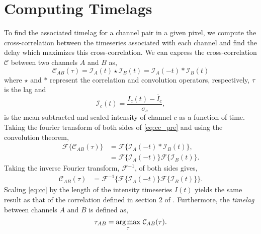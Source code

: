 \section{Computing Timelags}\label{timelag_details}

To find the associated timelag for a channel pair in a given pixel, we compute the cross-correlation between the timeseries associated with each channel and find the delay which maximizes this cross-correlation. We can express the cross-correlation $\mathcal{C}$ between two channels $A$ and $B$ as,
\begin{equation}\label{eq:cc_pre}
    \mathcal{C}_{AB}(\tau) = \mathcal{I}_A(t)\star\mathcal{I}_B(t) = \mathcal{I}_A(-t)\ast\mathcal{I}_B(t)
\end{equation}
where $\star$ and $\ast$ represent the correlation and convolution operators, respectively, $\tau$ is the lag and
\begin{equation*}
    \mathcal{I}_c(t)=\frac{I_c(t)-\bar{I}_c}{\sigma_{c}},
\end{equation*}
is the mean-subtracted and scaled intensity of channel $c$ as a function of time. Taking the fourier transform of both sides of \autoref{eq:cc_pre} and using the convolution theorem,
\begin{align*}
    \mathcal{F}\{\mathcal{C}_{AB}(\tau)\} &= \mathcal{F}\{\mathcal{I}_A(-t)\ast\mathcal{I}_B(t)\},\\
    &= \mathcal{F}\{\mathcal{I}_A(-t)\}\mathcal{F}\{\mathcal{I}_B(t)\}.
\end{align*}
Taking the inverse Fourier transform, $\mathcal{F}^{-1}$, of both sides gives,
\begin{align}\label{eq:cc}
    \mathcal{C}_{AB}(\tau) &= \mathcal{F}^{-1}\{\mathcal{F}\{\mathcal{I}_A(-t)\}\mathcal{F}\{\mathcal{I}_B(t)\}\}.
\end{align}
Scaling \autoref{eq:cc} by the length of the intensity timeseries $I(t)$ yields the same result as that of the correlation defined in section 2 of \citet{viall_evidence_2012}. Furthermore, the \textit{timelag} between channels $A$ and $B$ is defined as,
\begin{equation}\label{eq:timelag}
    \tau_{AB} = \argmax_{\tau}\,\mathcal{C}_{AB}(\tau).
\end{equation}

